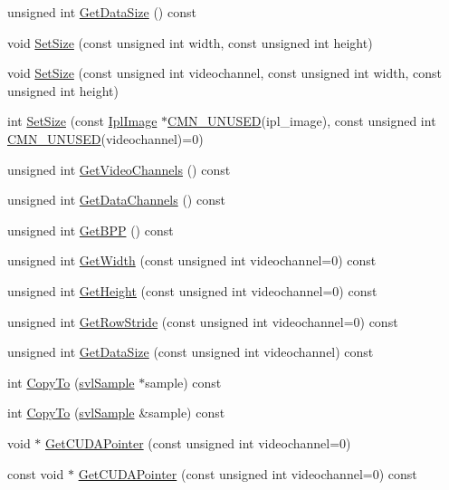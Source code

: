 \begin{DoxyCompactItemize}
unsigned int \hyperlink{classsvl_sample_c_u_d_a_image_custom_a13164006726f6feab443cad5838d9e21}{Get\-Data\-Size} () const 
\item 
void \hyperlink{classsvl_sample_c_u_d_a_image_custom_a2f2ff05dbc7045bc600e3d61762fb96d}{Set\-Size} (const unsigned int width, const unsigned int height)
\item 
void \hyperlink{classsvl_sample_c_u_d_a_image_custom_ab07bd9b726eeb5137a5508a6f8b43043}{Set\-Size} (const unsigned int videochannel, const unsigned int width, const unsigned int height)
\item 
int \hyperlink{classsvl_sample_c_u_d_a_image_custom_ae9853bef52427b9e51e3d0c2a98cd403}{Set\-Size} (const \hyperlink{svl_types_8h_aa5a40a13021ba9708bfe921e18fdfa53}{Ipl\-Image} $\ast$\hyperlink{cmn_portability_8h_a021894e2626935fa2305434b1e893ff6}{C\-M\-N\-\_\-\-U\-N\-U\-S\-E\-D}(ipl\-\_\-image), const unsigned int \hyperlink{cmn_portability_8h_a021894e2626935fa2305434b1e893ff6}{C\-M\-N\-\_\-\-U\-N\-U\-S\-E\-D}(videochannel)=0)
\item 
unsigned int \hyperlink{classsvl_sample_c_u_d_a_image_custom_a01f74e4d6bffe1c868a589d282c4094a}{Get\-Video\-Channels} () const 
\item 
unsigned int \hyperlink{classsvl_sample_c_u_d_a_image_custom_a7f1e6872613762fd4e5575618d61b2ff}{Get\-Data\-Channels} () const 
\item 
unsigned int \hyperlink{classsvl_sample_c_u_d_a_image_custom_a448fb7eaf742ac6cba8fdcfe5e25bb27}{Get\-B\-P\-P} () const 
\item 
unsigned int \hyperlink{classsvl_sample_c_u_d_a_image_custom_a0d0a411f2c9079b065457d2e74a13c1e}{Get\-Width} (const unsigned int videochannel=0) const 
\item 
unsigned int \hyperlink{classsvl_sample_c_u_d_a_image_custom_aa2654e88559a37dd01bfda572d53be38}{Get\-Height} (const unsigned int videochannel=0) const 
\item 
unsigned int \hyperlink{classsvl_sample_c_u_d_a_image_custom_aac061e7c49bfb41bf959ba9a163911d8}{Get\-Row\-Stride} (const unsigned int videochannel=0) const 
\item 
unsigned int \hyperlink{classsvl_sample_c_u_d_a_image_custom_a91f5c83941f02372a8651075c66ff30a}{Get\-Data\-Size} (const unsigned int videochannel) const 
\item 
int \hyperlink{classsvl_sample_c_u_d_a_image_custom_a5418d956d939bacb7d52fd8de68d80ef}{Copy\-To} (\hyperlink{classsvl_sample}{svl\-Sample} $\ast$sample) const 
\item 
int \hyperlink{classsvl_sample_c_u_d_a_image_custom_a59cac1789dd95f42682d641f80481044}{Copy\-To} (\hyperlink{classsvl_sample}{svl\-Sample} \&sample) const 
\item 
void $\ast$ \hyperlink{classsvl_sample_c_u_d_a_image_custom_a2ba32ac11679f0a872c80104d0c25730}{Get\-C\-U\-D\-A\-Pointer} (const unsigned int videochannel=0)
\item 
const void $\ast$ \hyperlink{classsvl_sample_c_u_d_a_image_custom_a5df6887a631918cbad4434329bba7073}{Get\-C\-U\-D\-A\-Pointer} (const unsigned int videochannel=0) const 
\end{DoxyCompactItemize}
